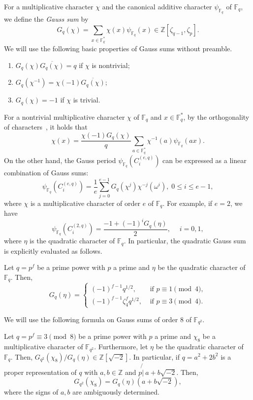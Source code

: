 \documentclass[ALCO,ThmDefs,Unicode]{cedram}
\newcommand*\Z{{\mathbb Z}}
\newcommand*\F{{\mathbb F}}
\newcommand*{\romanenumi}{\renewcommand*{\theenumi}{\roman{enumi}}}
\begin{document}
For a multiplicative character $\chi$ and the canonical additive character $\psi_{\F_q}$ of $\F_q$, we define the \emph{Gauss sum} by
\[
G_q(\chi)=\sum_{x\in \F_q^\ast}\chi(x)\psi_{\F_q}(x) \in \Z[\zeta_{q-1},\zeta_p].
\]
We will use the following basic properties of Gauss sums without preamble.
\begin{enumerate}\romanenumi
\item $G_q(\chi)\overline{G_q(\chi)}=q$ if $\chi$ is nontrivial;
\item $G_q(\chi^{-1})=\chi(-1)\overline{G_q(\chi)}$;
\item $G_q(\chi)=-1$ if $\chi$ is trivial.
\end{enumerate}
For a nontrivial multiplicative character $\chi$ of $\F_q$ and $x\in \F_q^\ast$, by the orthogonality of characters~\cite[(5.16), p.~195]{LN97}, it holds that
\begin{equation}\label{eq:oth_g}
\chi(x)=\frac{\chi(-1)G_q(\chi)}{q}\sum_{a\in \F_q^\ast}\chi^{-1}(a)\psi_{\F_q}(ax).
\end{equation}
On the other hand, the Gauss period $\psi_{\F_q}(C_i^{(e,q)})$ can be expressed as a linear combination of Gauss sums:
\begin{equation}
\psi_{\F_q}(C_i^{(e,q)})=\frac{1}{e}\sum_{j=0}^{e-1}G_q(\chi^{j})\chi^{-j}(\omega^i), \; 0\le i\le e-1,
\end{equation}
where $\chi$ is a multiplicative character of order $e$ of $\F_q$. For example, if $e=2$, we have
\begin{equation}\label{eq:Gaussquad}
\psi_{\F_q}(C_i^{(2,q)})=\frac{-1+(-1)^iG_q(\eta)}{2},\; \quad i=0,1,
\end{equation}
where $\eta$ is the quadratic character of $\F_q$. In particular, the quadratic Gauss sum is explicitly evaluated as follows.

\begin{theo}
\cite[Theorem~5.15]{LN97} \label{thm:Gauss}
Let $q=p^f$ be a prime power with $p$ a prime and $\eta$ be the quadratic character of $\F_q$. Then,
\[
G_q(\eta)=
\begin{cases}
(-1)^{f-1}q^{1/2},& \text{ if } p\equiv 1\pmod{4}, \\
(-1)^{f-1}\zeta_4^f q^{1/2}, & \text{ if } p\equiv 3\pmod{4}.
\end{cases}
\]
\end{theo}

We will use the following formula on Gauss sums of order $8$ of $\F_{q^2}$.

\begin{theo}[{\cite[Theorem~1.5]{Mv}}] \label{thm:Gauss8}
Let $q=p^f\equiv 3\pmod{8}$ be a prime power with $p$ a prime and $\chi_8$ be a multiplicative character of $\F_{q^2}$. Furthermore, let $\eta$ be the quadratic character of $\F_q$. Then, $G_{q^2}(\chi_8)/G_q(\eta)\in \Z[\sqrt{-2}]$. In particular, if $q=a^2+2b^2$ is a proper representation of $q$ with $a,b\in\Z$ and $p\mathbin{\not{|}\:} a+b\sqrt{-2}$. Then,
\[
G_{q^2}(\chi_8)=G_q(\eta)(a+b\sqrt{-2}),
\]
where the signs of $a,b$ are ambiguously determined.
\end{theo}
\end{document}
